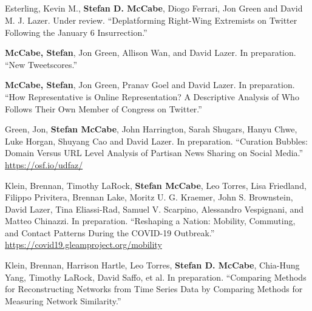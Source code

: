 \documentclass[11pt, letter]{article}
\begin{document}
\subsection*{} %
\vspace{-6mm} %
\begin{hangparas}{.25in}{1}
Esterling, Kevin M.,\textsuperscript{\textdagger} \textbf{Stefan D.
McCabe},\textsuperscript{\textdagger} Diogo Ferrari, Jon Green and David M. J.
Lazer. Under review. ``Deplatforming Right-Wing Extremists on Twitter
Following the January 6 Insurrection.''\vspace{2mm}

\textbf{McCabe, Stefan}, Jon Green, Allison Wan, and David Lazer. In
preparation. ``New Tweetscores.''\vspace{2mm}

\textbf{McCabe, Stefan}, Jon Green, Pranav Goel and David Lazer. In preparation.
``How Representative is Online Representation? A Descriptive Analysis of Who
Follows Their Own Member of Congress on Twitter.''\vspace{2mm}

Green, Jon,\textsuperscript{\textdagger} \textbf{Stefan
  McCabe},\textsuperscript{\textdagger} John Harrington, Sarah Shugars, Hanyu
Chwe, Luke Horgan, Shuyang Cao and David Lazer. In preparation. ``Curation
Bubbles: Domain Versus URL Level Analysis of Partisan News Sharing on Social
Media.'' \href{https://osf.io/udfaz/}{https://osf.io/udfaz/} \vspace{2mm}

Klein, Brennan,\textsuperscript{\textdagger} Timothy
LaRock,\textsuperscript{\textdagger} \textbf{Stefan
  McCabe},\textsuperscript{\textdagger} Leo Torres,\textsuperscript{\textdagger}
Lisa Friedland, Filippo Privitera, Brennan Lake, Moritz U. G. Kraemer, John S.
Brownstein, David Lazer, Tina Eliassi-Rad, Samuel V. Scarpino, Alessandro
Vespignani, and Matteo Chinazzi. In preparation. ``Reshaping a Nation: Mobility,
Commuting, and Contact Patterns During the COVID-19 Outbreak.''
\href{https://covid19.gleamproject.org/mobility}{https://covid19.gleamproject.org/mobility} \vspace{2mm}

Klein, Brennan, Harrison Hartle, Leo Torres, \textbf{Stefan D. McCabe},
Chia-Hung Yang, Timothy LaRock, David Saffo, et al. In preparation. ``Comparing
Methods for Reconstructing Networks from Time Series Data by Comparing Methods
for Measuring Network Similarity.'' \vspace{2mm}


\end{hangparas}
\end{document}
